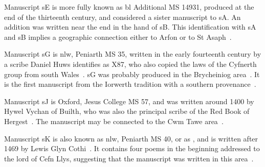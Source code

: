 Manuscript \gls{sE} is more fully known as \acrshort{bl} Additional MS 14931,  produced at the end of the thirteenth century, and  considered a sister manuscript to \gls{sA}. An addition was written near the end in the hand of \gls{sB}. This identification with \gls{sA} and \gls{sB} implies a geographic connection either to Arfon or to St Asaph~\autocite[100]{charles-edwards_welsh_1989}.

Manuscript \gls{sG} is \acrshort{nlw}, Peniarth MS 35, written in the early fourteenth century by a scribe  Daniel Huws identifies as X87, who also copied the laws of the Cyfnerth group from south Wales~\autocite{smith_tei_2013}. \Gls{sG} was probably produced in the Brycheiniog area~\autocite[v]{elias_golygiad_2007}. It is the first manuscript from the Iorwerth tradition with a southern provenance~\autocite{charles-edwards_introduction_1986}.

Manuscript \gls{sJ} is Oxford, Jesus College MS 57, and was written around 1400 by Hywel Vychan of Builth, who was also the principal scribe of the Red Book of Hergest~\autocite[100]{charles-edwards_welsh_1989}. The manuscript may be connected to the Cwm Tawe area~\autocite{james_llwyr_1993}.

Manuscript \gls{sK} is also known as \acrshort{nlw}, Peniarth MS 40, or as , and is written after 1469 by Lewis Glyn Cothi~\autocite{roberts_cyfraith_2011}. It contains four poems in the beginning addressed to the lord of Cefn Llys, suggesting that the manuscript was written in this area~\autocite[374]{evans_report_1899}.

